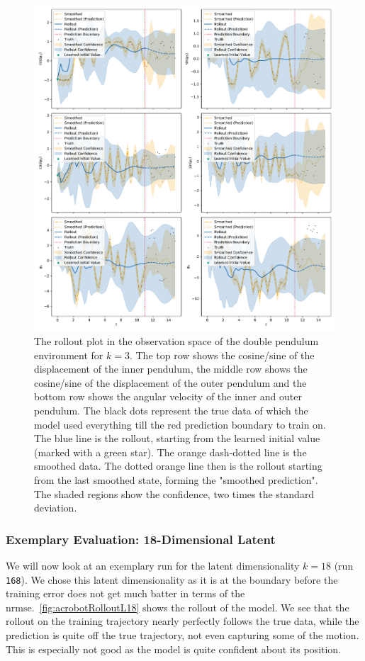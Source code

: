 			\begin{figure}
				\centering
				\includegraphics[width=0.9\linewidth]{figures/results/acrobot-gym/run-latent-dim-03/rollout-observations-N0.pdf}
				\caption{The rollout plot in the observation space of the double pendulum environment for \(k = 3\). The top row shows the cosine/sine of the displacement of the inner pendulum, the middle row shows the cosine/sine of the displacement of the outer pendulum and the bottom row shows the angular velocity of the inner and outer pendulum. The black dots represent the true data of which the model used everything till the red prediction boundary to train on. The blue line is the rollout, starting from the learned initial value (marked with a green star). The orange dash-dotted line is the smoothed data. The dotted orange line then is the rollout starting from the last smoothed state, forming the "smoothed prediction". The shaded regions show the confidence, \ie two times the standard deviation.}
				\label{fig:acrobotRolloutL03}
			\end{figure}

		\subsubsection{Exemplary Evaluation: 18-Dimensional Latent}
			We will now look at an exemplary run for the latent dimensionality \( k = 18 \) (run \texttt{168}). We chose this latent dimensionality as it is at the boundary before the training error does not get much batter in terms of the \ac{nrmse}.~\autoref{fig:acrobotRolloutL18} shows the rollout of the model. We see that the rollout on the training trajectory nearly perfectly follows the true data, while the prediction is quite off the true trajectory, not even capturing some of the motion. This is especially not good as the model is quite confident about its position.

